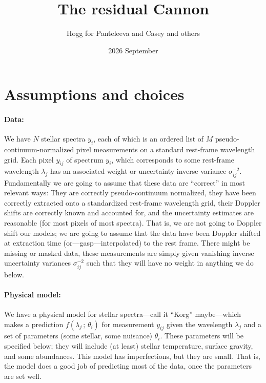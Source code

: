 \documentclass{article}
\title{\bfseries The residual Cannon}
\author{Hogg for Panteleeva and Casey and others}
\date{2026 September}
\newcommand{\semicolon}{\,;\,}
\begin{document}
\maketitle

\section{Assumptions and choices}
\paragraph{Data:}
We have $N$ stellar spectra $y_i$, each of which is an ordered list of $M$ pseudo-continuum-normalized pixel measurements on a standard rest-frame wavelength grid.
Each pixel $y_{ij}$ of spectrum $y_i$, which corresponds to some rest-frame wavelength $\lambda_j$ has an associated weight or uncertainty inverse variance $\sigma^{-2}_{ij}$.
Fundamentally we are going to assume that these data are ``correct'' in most relevant ways:
They are correctly pseudo-continuum normalized, they have been correctly extracted onto a standardized rest-frame wavelength grid, their Doppler shifts are correctly known and accounted for, and the uncertainty estimates are reasonable (for most pixels of most spectra).
That is, we are not going to Doppler shift our models; we are going to assume that the data have been Doppler shifted at extraction time (or---gasp---interpolated) to the rest frame.
There might be missing or masked data, these measurements are simply given vanishing inverse uncertainty variances $\sigma^{-2}_{ij}$ such that they will have no weight in anything we do below.

\paragraph{Physical model:}
We have a physical model for stellar spectra---call it ``Korg'' maybe---which makes a prediction $f(\lambda_j\semicolon\theta_i)$ for measurement $y_{ij}$ given the wavelength $\lambda_j$ and a set of parameters (some stellar, some nuisance) $\theta_i$.
These parameters will be specified below; they will include (at least) stellar temperature, surface gravity, and some abundances.
This model has imperfections, but they are small.
That is, the model does a good job of predicting most of the data, once the parameters are set well.
\end{document}
